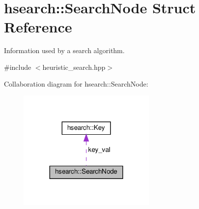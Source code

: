 \hypertarget{structhsearch_1_1SearchNode}{}\section{hsearch\+:\+:Search\+Node Struct Reference}
\label{structhsearch_1_1SearchNode}


Information used by a search algorithm.  




{\ttfamily \#include $<$heuristic\+\_\+search.\+hpp$>$}



Collaboration diagram for hsearch\+:\+:Search\+Node\+:
\nopagebreak
\begin{figure}[H]
\begin{center}
\leavevmode
\includegraphics[width=191pt]{db/d43/structhsearch_1_1SearchNode__coll__graph}
\end{center}
\end{figure}

